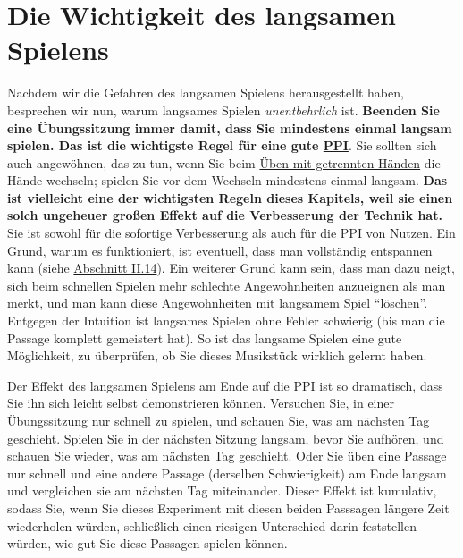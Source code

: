 \hypertarget{c1ii17}{}


\section{Die Wichtigkeit des langsamen Spielens}

Nachdem wir die Gefahren des langsamen Spielens herausgestellt haben, besprechen wir nun, warum langsames Spielen \textit{unentbehrlich} ist.
\textbf{Beenden Sie eine Übungssitzung immer damit, dass Sie mindestens einmal langsam spielen.
Das ist die wichtigste Regel für eine gute \hyperlink{c1ii15}{PPI}}.
Sie sollten sich auch angewöhnen, das zu tun, wenn Sie beim \hyperlink{c1ii7}{Üben mit getrennten Händen} die Hände wechseln; spielen Sie vor dem Wechseln mindestens einmal langsam.
\textbf{Das ist vielleicht eine der wichtigsten Regeln dieses Kapitels, weil sie einen solch ungeheuer großen Effekt auf die Verbesserung der Technik hat.}
Sie ist sowohl für die sofortige Verbesserung als auch für die PPI von Nutzen.
Ein Grund, warum es funktioniert, ist eventuell, dass man vollständig entspannen kann (siehe \hyperlink{c1ii14}{Abschnitt II.14}).
Ein weiterer Grund kann sein, dass man dazu neigt, sich beim schnellen Spielen mehr schlechte Angewohnheiten anzueignen als man merkt, und man kann diese Angewohnheiten mit langsamem Spiel \enquote{löschen}.
Entgegen der Intuition ist langsames Spielen ohne Fehler schwierig (bis man die Passage komplett gemeistert hat).
So ist das langsame Spielen eine gute Möglichkeit, zu überprüfen, ob Sie dieses Musikstück wirklich gelernt haben.

Der Effekt des langsamen Spielens am Ende auf die PPI ist so dramatisch, dass Sie ihn sich leicht selbst demonstrieren können.
Versuchen Sie, in einer Übungssitzung nur schnell zu spielen, und schauen Sie, was am nächsten Tag geschieht.
Spielen Sie in der nächsten Sitzung langsam, bevor Sie aufhören, und schauen Sie wieder, was am nächsten Tag geschieht.
Oder Sie üben eine Passage nur schnell und eine andere Passage (derselben Schwierigkeit) am Ende langsam und vergleichen sie am nächsten Tag miteinander.
Dieser Effekt ist kumulativ, sodass Sie, wenn Sie dieses Experiment mit diesen beiden Passsagen längere Zeit wiederholen würden, schließlich einen riesigen Unterschied darin feststellen würden, wie gut Sie diese Passagen spielen können.

